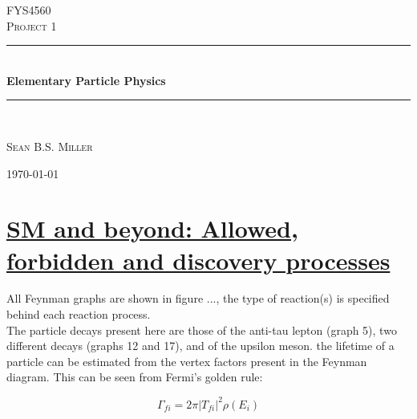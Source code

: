 \documentclass[11pt,a4paper]{article}
\newcommand{\HRule}{\rule{\linewidth}{0.5mm}}
\begin{document}
\begin{titlepage}
\begin{center}
\medskip
\textsc{\LARGE FYS4560}\\[1.5cm]

\textsc{\Large Project 1}\\[0.5cm]

\HRule \\[1.0cm]
{ \huge \bfseries Elementary Particle Physics \\[0.4cm] }
\HRule \huge \\[1.5cm]

\begin{minipage}{0.4\textwidth}
\begin{center}
\large\textsc{Sean B.S. Miller}\\

\end{center}
\end{minipage}

\vfill

{\large \today}

\end{center}
\end{titlepage}

\newpage

\fancyhead[C]{\textsc{\today}}
\fancyfoot[C]{\thepage}

\section{\underline{SM and beyond: Allowed, forbidden and discovery processes}}
All Feynman graphs are shown in figure ..., the type of reaction(s) is specified behind each reaction process.\\
The particle decays present here are those of the anti-tau lepton (graph 5), two different decays (graphs 12 and 17), and of the upsilon meson. the lifetime of a particle can be estimated from the vertex factors present in the Feynman diagram. This can be seen from Fermi's golden rule:

\begin{equation}
	\Gamma_{fi} = 2\pi|T_{fi}|^2\rho(E_i)
\end{equation}
\end{document}
